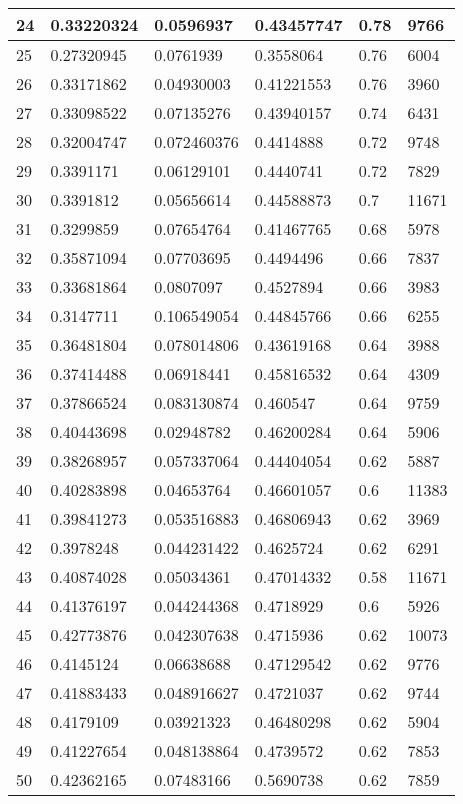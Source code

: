 \begin{longtable}{|l|l|l|l|l|l|}
24 & 0.33220324 & 0.0596937 & 0.43457747 & 0.78 & 9766 \\ \hline 
25 & 0.27320945 & 0.0761939 & 0.3558064 & 0.76 & 6004 \\ \hline 
26 & 0.33171862 & 0.04930003 & 0.41221553 & 0.76 & 3960 \\ \hline 
27 & 0.33098522 & 0.07135276 & 0.43940157 & 0.74 & 6431 \\ \hline 
28 & 0.32004747 & 0.072460376 & 0.4414888 & 0.72 & 9748 \\ \hline 
29 & 0.3391171 & 0.06129101 & 0.4440741 & 0.72 & 7829 \\ \hline 
30 & 0.3391812 & 0.05656614 & 0.44588873 & 0.7 & 11671 \\ \hline 
31 & 0.3299859 & 0.07654764 & 0.41467765 & 0.68 & 5978 \\ \hline 
32 & 0.35871094 & 0.07703695 & 0.4494496 & 0.66 & 7837 \\ \hline 
33 & 0.33681864 & 0.0807097 & 0.4527894 & 0.66 & 3983 \\ \hline 
34 & 0.3147711 & 0.106549054 & 0.44845766 & 0.66 & 6255 \\ \hline 
35 & 0.36481804 & 0.078014806 & 0.43619168 & 0.64 & 3988 \\ \hline 
36 & 0.37414488 & 0.06918441 & 0.45816532 & 0.64 & 4309 \\ \hline 
37 & 0.37866524 & 0.083130874 & 0.460547 & 0.64 & 9759 \\ \hline 
38 & 0.40443698 & 0.02948782 & 0.46200284 & 0.64 & 5906 \\ \hline 
39 & 0.38268957 & 0.057337064 & 0.44404054 & 0.62 & 5887 \\ \hline 
40 & 0.40283898 & 0.04653764 & 0.46601057 & 0.6 & 11383 \\ \hline 
41 & 0.39841273 & 0.053516883 & 0.46806943 & 0.62 & 3969 \\ \hline 
42 & 0.3978248 & 0.044231422 & 0.4625724 & 0.62 & 6291 \\ \hline 
43 & 0.40874028 & 0.05034361 & 0.47014332 & 0.58 & 11671 \\ \hline 
44 & 0.41376197 & 0.044244368 & 0.4718929 & 0.6 & 5926 \\ \hline 
45 & 0.42773876 & 0.042307638 & 0.4715936 & 0.62 & 10073 \\ \hline 
46 & 0.4145124 & 0.06638688 & 0.47129542 & 0.62 & 9776 \\ \hline 
47 & 0.41883433 & 0.048916627 & 0.4721037 & 0.62 & 9744 \\ \hline 
48 & 0.4179109 & 0.03921323 & 0.46480298 & 0.62 & 5904 \\ \hline 
49 & 0.41227654 & 0.048138864 & 0.4739572 & 0.62 & 7853 \\ \hline 
50 & 0.42362165 & 0.07483166 & 0.5690738 & 0.62 & 7859 \\ \hline 
\end{longtable}